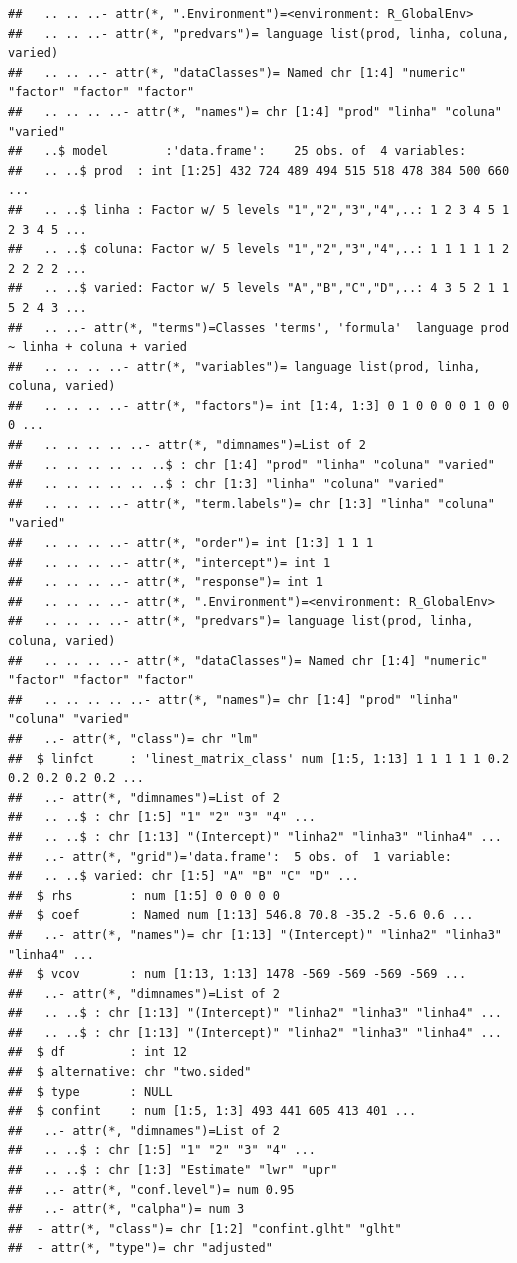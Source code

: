 \documentclass[
]{book}
\begin{document}
\begin{verbatim}
##   .. .. ..- attr(*, ".Environment")=<environment: R_GlobalEnv> 
##   .. .. ..- attr(*, "predvars")= language list(prod, linha, coluna, varied)
##   .. .. ..- attr(*, "dataClasses")= Named chr [1:4] "numeric" "factor" "factor" "factor"
##   .. .. .. ..- attr(*, "names")= chr [1:4] "prod" "linha" "coluna" "varied"
##   ..$ model        :'data.frame':    25 obs. of  4 variables:
##   .. ..$ prod  : int [1:25] 432 724 489 494 515 518 478 384 500 660 ...
##   .. ..$ linha : Factor w/ 5 levels "1","2","3","4",..: 1 2 3 4 5 1 2 3 4 5 ...
##   .. ..$ coluna: Factor w/ 5 levels "1","2","3","4",..: 1 1 1 1 1 2 2 2 2 2 ...
##   .. ..$ varied: Factor w/ 5 levels "A","B","C","D",..: 4 3 5 2 1 1 5 2 4 3 ...
##   .. ..- attr(*, "terms")=Classes 'terms', 'formula'  language prod ~ linha + coluna + varied
##   .. .. .. ..- attr(*, "variables")= language list(prod, linha, coluna, varied)
##   .. .. .. ..- attr(*, "factors")= int [1:4, 1:3] 0 1 0 0 0 0 1 0 0 0 ...
##   .. .. .. .. ..- attr(*, "dimnames")=List of 2
##   .. .. .. .. .. ..$ : chr [1:4] "prod" "linha" "coluna" "varied"
##   .. .. .. .. .. ..$ : chr [1:3] "linha" "coluna" "varied"
##   .. .. .. ..- attr(*, "term.labels")= chr [1:3] "linha" "coluna" "varied"
##   .. .. .. ..- attr(*, "order")= int [1:3] 1 1 1
##   .. .. .. ..- attr(*, "intercept")= int 1
##   .. .. .. ..- attr(*, "response")= int 1
##   .. .. .. ..- attr(*, ".Environment")=<environment: R_GlobalEnv> 
##   .. .. .. ..- attr(*, "predvars")= language list(prod, linha, coluna, varied)
##   .. .. .. ..- attr(*, "dataClasses")= Named chr [1:4] "numeric" "factor" "factor" "factor"
##   .. .. .. .. ..- attr(*, "names")= chr [1:4] "prod" "linha" "coluna" "varied"
##   ..- attr(*, "class")= chr "lm"
##  $ linfct     : 'linest_matrix_class' num [1:5, 1:13] 1 1 1 1 1 0.2 0.2 0.2 0.2 0.2 ...
##   ..- attr(*, "dimnames")=List of 2
##   .. ..$ : chr [1:5] "1" "2" "3" "4" ...
##   .. ..$ : chr [1:13] "(Intercept)" "linha2" "linha3" "linha4" ...
##   ..- attr(*, "grid")='data.frame':  5 obs. of  1 variable:
##   .. ..$ varied: chr [1:5] "A" "B" "C" "D" ...
##  $ rhs        : num [1:5] 0 0 0 0 0
##  $ coef       : Named num [1:13] 546.8 70.8 -35.2 -5.6 0.6 ...
##   ..- attr(*, "names")= chr [1:13] "(Intercept)" "linha2" "linha3" "linha4" ...
##  $ vcov       : num [1:13, 1:13] 1478 -569 -569 -569 -569 ...
##   ..- attr(*, "dimnames")=List of 2
##   .. ..$ : chr [1:13] "(Intercept)" "linha2" "linha3" "linha4" ...
##   .. ..$ : chr [1:13] "(Intercept)" "linha2" "linha3" "linha4" ...
##  $ df         : int 12
##  $ alternative: chr "two.sided"
##  $ type       : NULL
##  $ confint    : num [1:5, 1:3] 493 441 605 413 401 ...
##   ..- attr(*, "dimnames")=List of 2
##   .. ..$ : chr [1:5] "1" "2" "3" "4" ...
##   .. ..$ : chr [1:3] "Estimate" "lwr" "upr"
##   ..- attr(*, "conf.level")= num 0.95
##   ..- attr(*, "calpha")= num 3
##  - attr(*, "class")= chr [1:2] "confint.glht" "glht"
##  - attr(*, "type")= chr "adjusted"
\end{verbatim}
\end{document}
